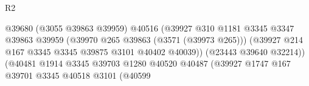 \begin{lexlean}{R2}
\begin{coremodule}
                                                          @39680
                                                          (@3055 @39863 @39959)
                                                          @40516
                                                          (@39927
                                                            @310
                                                            @1181
                                                            @3345
                                                            @3347
                                                            @39863
                                                            @39959
                                                            (@39970
                                                              @265
                                                              @39863
                                                              (@3571 (@39973 @265)))
                                                            (@39927
                                                              @214
                                                              @167
                                                              @3345
                                                              @3345
                                                              @39875
                                                              @3101
                                                              @40402
                                                              @40039))
                                                          (@23443 @39640 @32214))
                                                        (@40481
                                                          @1914
                                                          @3345
                                                          @39703
                                                          @1280
                                                          @40520
                                                          @40487
                                                          (@39927
                                                            @1747
                                                            @167
                                                            @39701
                                                            @3345
                                                            @40518
                                                            @3101
                                                            (@40599

\end{coremodule}
\end{lexlean}

